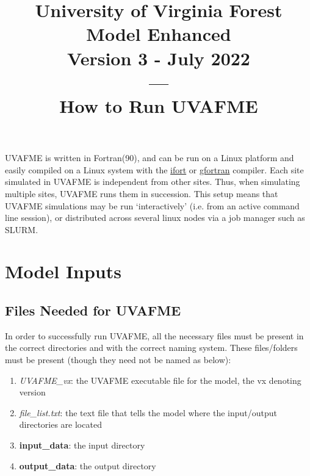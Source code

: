 \documentclass[a4paper, 12pt] {article}
\begin{document}
     \title{%
University of Virginia Forest Model Enhanced \\
\large Version 3 - July 2022\\
---\\
\large How to Run UVAFME
}
     \maketitle

\tableofcontents

\pagebreak

UVAFME is written in Fortran(90), and can be run on a Linux platform and easily compiled on a Linux system with the \href{https://software.intel.com/en-us/fortran-compilers}{ifort} or \href{https://gcc.gnu.org/wiki/GFortran}{gfortran} compiler. Each site simulated in UVAFME is independent from other sites. Thus, when simulating multiple sites, UVAFME runs them in succession. This setup means that UVAFME simulations may be run `interactively' (i.e. from an active command line session), or distributed across several linux nodes via a job manager such as SLURM.

\section{Model Inputs} \label{inputs}

\subsection{Files Needed for UVAFME}

In order to successfully run UVAFME, all the necessary files must be present in the correct directories and with the correct naming system. These files/folders must be present (though they need not be named as below):

\begin{enumerate}
\item \textit{UVAFME\_vx}: the UVAFME executable file for the model, the vx denoting version
\item \textit{file\_list.txt}: the text file that tells the model where the input/output directories are located
\item \textbf{input\_data}: the input directory
\item \textbf{output\_data}: the output directory
\end{enumerate}
\end{document}
